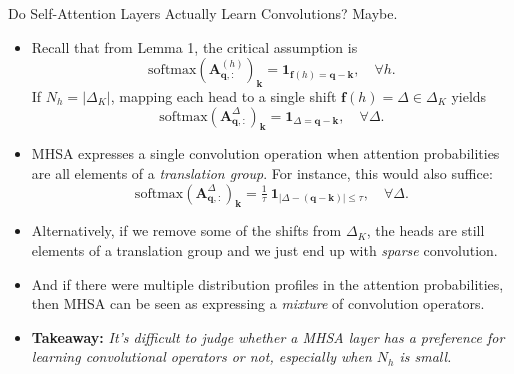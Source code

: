 \documentclass[9pt]{beamer}
\newcommand{\abs}[1]{\left\vert#1\right\vert}
\newcommand{\mb}{\bm}
\begin{document}
\begin{frame}{Do Self-Attention Layers Actually Learn Convolutions? Maybe.}
\begin{itemize}
\item Recall that from Lemma 1, the critical assumption is
\begin{equation*}
    \mathrm{softmax}(\mb A^{(h)}_{\mb q,:})_{\mb k} 
        = \bm 1_{\bm f(h) = \bm q - \bm k}, 
        \quad \forall h.
\end{equation*}
If $N_h=\abs{\Delta_K}$, mapping each head to a single shift $\bm f(h)=\bm\varDelta\in\Delta_K$ yields 
\begin{equation*}
    \mathrm{softmax}(\mb A^{\bm\varDelta}_{\mb q,:})_{\mb k} 
        = \bm 1_{\bm \varDelta = \bm q - \bm k}, 
        \quad \forall \bm\varDelta.
\end{equation*}

\item MHSA expresses a single convolution operation when attention probabilities are all elements of a {\em translation group}. For instance, this would also suffice:
\begin{equation*}
    \mathrm{softmax}(\mb A^{\bm\varDelta}_{\mb q,:})_{\mb k} 
        = \tfrac1\tau\ \bm 1_{\abs{\bm \varDelta - (\bm q - \bm k)}\leq\tau},
        \quad \forall \bm\varDelta.
\end{equation*}

\item Alternatively, if we remove some of the shifts from $\Delta_K$, the heads are still elements of a translation group and we just end up with {\em sparse} convolution.

\item And if there were multiple distribution profiles in the attention probabilities, then MHSA can be seen as expressing a {\em mixture} of convolution operators.

\item \textbf{Takeaway:} \emph{It's difficult to judge whether a MHSA layer has a preference for learning convolutional operators or not, especially when $N_h$ is small.}
\end{itemize}
\end{frame}
\end{document}
